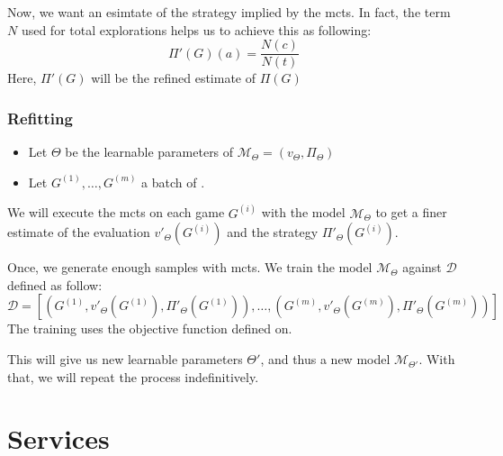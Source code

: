 Now, we want an esimtate of the strategy implied by the \acrshort{mcts}. In fact, the  term $N$ used for total explorations helps us to achieve this as following:
\begin{equation}
	\Pi'(G)(a) = \frac{N(c)}{N(t)} 
\end{equation}
Here, $\Pi'(G)$ will be the refined estimate of $\Pi(G)$

\subsubsection{Refitting}
\begin{itemize}
	\item Let $\Theta$ be the learnable parameters of $\mathcal{M}_\Theta=(v_{\Theta},\Pi_{\Theta})$
	\item Let $G^{(1)},\dots,G^{(m)}$ a batch of .
\end{itemize}
We will execute the \acrshort{mcts} on each game $G^{(i)}$ with the model $\mathcal{M}_{\Theta}$ to get a finer estimate of the evaluation $v'_{\Theta}(G^{(i)})$ and the strategy $\Pi'_{\Theta}(G^{(i)}).$

Once, we generate enough samples with \acrshort{mcts}. We train the model $\mathcal{M}_{\Theta}$ against $\mathscr{D}$ defined as follow:
$$
\mathscr{D}=\left[\left(G^{(1)},v'_{\Theta}(G^{(1)}),\Pi'_{\Theta}(G^{(1)})\right), \dots,\left(G^{(m)},v'_{\Theta}(G^{(m)}),\Pi'_{\Theta}(G^{(m)})\right)\right]
$$ 
The training uses the objective function defined on.

This will give us new learnable parameters $\Theta'$, and thus a new model $\mathcal{M}_{\Theta'}.$ With that, we will repeat the process indefinitively.


\section{Services}
